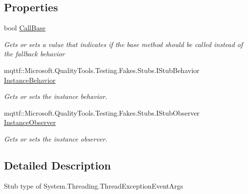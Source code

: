 \subsection*{Properties}
\begin{DoxyCompactItemize}
\item 
bool \hyperlink{class_system_1_1_threading_1_1_fakes_1_1_stub_thread_exception_event_args_a4a34ca3a32864be7c8fba6400c922840}{Call\-Base}
\begin{DoxyCompactList}\small\item\em Gets or sets a value that indicates if the base method should be called instead of the fallback behavior\end{DoxyCompactList}\item 
mqttf\-::\-Microsoft.\-Quality\-Tools.\-Testing.\-Fakes.\-Stubs.\-I\-Stub\-Behavior \hyperlink{class_system_1_1_threading_1_1_fakes_1_1_stub_thread_exception_event_args_a3fdaca7183a39e55e2fbbbdf2e22c6ef}{Instance\-Behavior}
\begin{DoxyCompactList}\small\item\em Gets or sets the instance behavior.\end{DoxyCompactList}\item 
mqttf\-::\-Microsoft.\-Quality\-Tools.\-Testing.\-Fakes.\-Stubs.\-I\-Stub\-Observer \hyperlink{class_system_1_1_threading_1_1_fakes_1_1_stub_thread_exception_event_args_a0f412220b811592d5be3be8f5c51d47c}{Instance\-Observer}
\begin{DoxyCompactList}\small\item\em Gets or sets the instance observer.\end{DoxyCompactList}\end{DoxyCompactItemize}


\subsection{Detailed Description}
Stub type of System.\-Threading.\-Thread\-Exception\-Event\-Args



